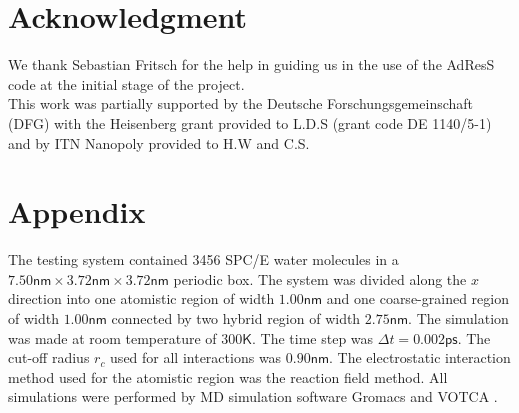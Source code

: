 \documentclass[aps,pre,preprint]{revtex4}
\begin{document}
\section{Acknowledgment}
We thank Sebastian Fritsch for the help in guiding us in the use of the AdResS code at the initial stage of the project.\\ 
This work was partially supported by the Deutsche Forschungsgemeinschaft (DFG) with the Heisenberg grant provided to L.D.S (grant code DE 1140/5-1) and by ITN Nanopoly provided to H.W and C.S.

\section{Appendix}
The testing system contained 3456 SPC/E \cite{berendsen1987missing}
water molecules in a $7.50\textsf{nm}\times 3.72\textsf{nm}\times
3.72\textsf{nm}$ periodic box. The system was divided along the $x$ direction
into one atomistic region of width $1.00\textsf{nm}$ and one
coarse-grained region of width $1.00\textsf{nm}$ connected by two
hybrid region of width $2.75\textsf{nm}$. The simulation was made at
room temperature of $300\textsf{K}$. The time step was $\Delta t =
0.002\textsf{ps}$. The cut-off radius $r_{c}$ used for all interactions was
$0.90\textsf{nm}$. The electrostatic interaction method used for the
atomistic region was the reaction field method. All simulations were
performed by MD simulation software Gromacs \cite{gromacs}
and VOTCA \cite{ruehle2009versatile}.




{}

\end{document}
